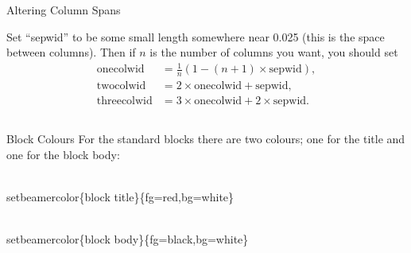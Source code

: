 \documentclass[final]{beamer}
\newlength{\sepwid}
\newlength{\onecolwid}
\newlength{\twocolwid}
\newlength{\threecolwid}
\begin{document}
\begin{frame}[t]
\begin{columns}[t]
\begin{column}{0.475\paperwidth}
\begin{block}{Altering Column Spans}

        Set ``sepwid'' to be some small length somewhere near 0.025 (this is the space between columns). Then if $n$ is the number of columns you want, you should set
        \begin{align*}
          \text{onecolwid} & = \frac{1}{n}(1-(n+1)\times\text{sepwid}), \\
          \text{twocolwid} & = 2\times\text{onecolwid} + \text{sepwid}, \\
          \text{threecolwid} & = 3\times\text{onecolwid} + 2\times\text{sepwid}.
        \end{align*}
      \end{block}
      \begin{columns}[t,totalwidth=\twocolwid]	%
        \begin{column}{\onecolwid}
          \begin{block}{Block Colours}
            For the standard blocks there are two colours; one for the title and one for the block body:\\
            \begin{semiverbatim}
              {\color{red}\\setbeamercolor}\{block title\}\newline \{fg=red,bg=white\}
            \end{semiverbatim}
            \begin{semiverbatim}
              {\color{red}\\setbeamercolor}\{block  body\}\newline \{fg=black,bg=white\}
            \end{semiverbatim}

\end{block}
\end{column}
\end{columns}
\end{column}
\end{columns}
\end{frame}
\end{document}
